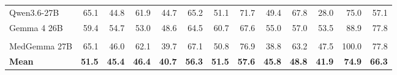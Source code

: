 \documentclass{article}
\begin{document}
\begin{figure}[htbp]
{\begin{tabular}{@{}l*{12}{r}@{}}
\midrule
Qwen3.6-27B               & 65.1 & 44.8 & 61.9 & 44.7 & 65.2 & 51.1 & 71.7 & 49.4 & 67.8 & 28.0 & 75.0 & 57.1 \\
Gemma 4 26B           & 59.4 & 54.7 & 53.0 & 48.6 & 64.5 & 60.7 & 67.6 & 55.0 & 57.0 & 53.5 & 88.9 & 77.8 \\
\addlinespace[1pt]
\multicolumn{13}{c}{\textit{Medical-domain LLMs}} \\
\midrule
MedGemma 27B          & 65.1 & 46.0 & 62.1 & 39.7 & 67.1 & 50.8 & 76.9 & 38.8 & 63.2 & 47.5 & 100.0 & 77.8 \\
\midrule
\textbf{Mean} & \textbf{51.5} & \textbf{45.4} & \textbf{46.4} & \textbf{40.7} & \textbf{56.3} & \textbf{51.5} & \textbf{57.6} & \textbf{45.8} & \textbf{48.8} & \textbf{41.9} & \textbf{74.9} & \textbf{66.3} \\
\bottomrule
\end{tabular}
\hspace{0pt}}

\vspace{0.35em}


\end{figure}
\end{document}
